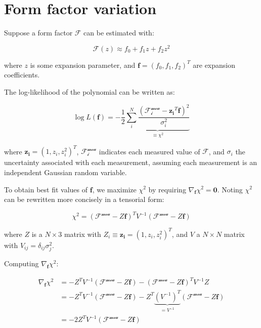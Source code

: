 \chapter{Form factor variation}
\label{appx:ff-var}

Suppose a form factor $\mathcal{F}$ can be estimated with:

\begin{equation}
    \mathcal{F}(z) \approx f_0 + f_1 z + f_2 z^2
\end{equation}

where $z$ is some expansion parameter, and $\bm{f} = (f_0, f_1, f_2)^T$ are
expansion coefficients.

The log-likelihood of the polynomial can be written as:

\begin{equation}
    \log L(\bm{f}) = - \frac{1}{2}
    \underbrace{
        \sum_{i}^N
        \frac{(\mathcal{F^\text{mea}_\text{$i$}} -
            \bm{z_i}^T \bm{f})^2}{\sigma_i^2}
    }_{\equiv \chi^2}
\end{equation}

where $\bm{z_i} = (1, z_i, z_i^2)^T$,
$\mathcal{F^\text{mea}_\text{$i$}}$ indicates each measured value of
$\mathcal{F}$,
and $\sigma_i$ the uncertainty associated with each measurement, assuming each
measurement is an independent Gaussian random variable.

To obtain best fit values of $\bm{f}$, we maximize $\chi^2$ by requiring
$\nabla_{\bm{f}} \chi^2 = \bm{0}$.
Noting $\chi^2$ can be rewritten more concisely in a tensorial form:

\begin{equation}
    \chi^2 = (\bm{\mathcal{F^\text{mea}}} - Z \bm{f})^T V^{-1}
        (\bm{\mathcal{F^\text{mea}}} - Z \bm{f})
\end{equation}

where $Z$ is a $N \times 3$ matrix with
$Z_i \equiv \bm{z_i} = (1, z_i, z^2_i)^T$,
and $V$ a $N \times N$ matrix with $V_{ij} = \delta_{ij} \sigma^2_j$.

Computing $\nabla_{\bm{f}} \chi^2$:

\begin{align}
    \nabla_{\bm{f}} \chi^2 &=
            -Z^T V^{-1} (\bm{\mathcal{F^\text{mea}}} - Z \bm{f})
            - (\bm{\mathcal{F^\text{mea}}} - Z \bm{f})^T V^{-1} Z
        \\
        &=
            -Z^T V^{-1} (\bm{\mathcal{F^\text{mea}}} - Z \bm{f})
            -Z^T \underbrace{(V^{-1})^T}_{ = V^{-1}}
                (\bm{\mathcal{F^\text{mea}}} - Z \bm{f})
        \\
        & = -2 Z^T V^{-1} (\bm{\mathcal{F^\text{mea}}} - Z \bm{f})
\end{align}

